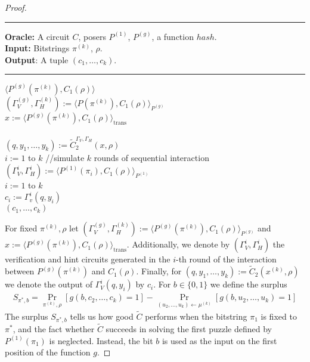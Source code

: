 \begin{proof}
\begin{codeblock}
  \medskip \hrule \medskip
  \textbf{Oracle:}  A circuit $C$, posers $P^{(1)}$, $P^{(g)}$, a function $hash$.\\
  \textbf{Input:} Bitstrings $\pi^{(k)}$, $\rho$.\\
  \textbf{Output}: A tuple $(c_1, \dots, c_k)$.
  \medskip\hrule\medskip
  \Run $\langle P^{(g)}(\pi^{(k)}), C_1(\rho) \rangle$ \\
  \IndI $(\Gamma_V^{(g)}, \Gamma_H^{(k)}) := \langle P(\pi^{(k)}), C_1(\rho) \rangle_{P^{(g)}}$ \\
  \IndI $x := \langle P^{(g)}(\pi^{(k)}), C_1(\rho) \rangle_{\text{trans}}$ \\ \\
  $(q, y_1, \dots, y_k) := \widetilde{C}_2^{\Gamma_V, \Gamma_H} (x, \rho)$ \\
  \For $i:=1$ to $k$ \Do \IndII //simulate $k$ rounds of sequential interaction \\
  \IndI $(\Gamma_V^{i}, \Gamma_H^{i}) := \langle P^{(1)}(\pi_i), C_1(\rho) \rangle_{P^{(1)}} $\\
  \For $i:=1$ to $k$ \Do \\
  \IndI $c_i := \Gamma_v^{i}(q, y_i)$\\
  \return $(c_1, \dots, c_k)$
\end{codeblock}
%

For fixed $\pi^{(k)}, \rho$ let $(\Gamma_V^{(g)}, \Gamma_H^{(k)}) := \langle P^{(g)}(\pi^{(k)}), C_1(\rho) \rangle_{P^{(g)}}$
and $x := \langle P^{(g)}(\pi^{(k)}), C_1(\rho) \rangle_{\text{trans}}$.
Additionally, we denote by $(\Gamma_V^{i}, \Gamma_H^{i})$ the verification and hint circuits generated in the $i$-th
round of the interaction between $P^{(g)}(\pi^{(k)})$ and $C_1(\rho)$.
Finally, for $(q,y_1, \dots, y_k) := \widetilde{C}_2(x^{(k)}, \rho)$ we denote the output of $\Gamma_V^i(q,y_i)$ by $c_i$.
For $b \in \{0,1\}$ we define the surplus
\begin{align}
  \label{eq:s_pi_b}
S_{\pi^*, b} = \underset{\pi^{(k)}, \rho}{\Pr}\left[g(b, c_2, \dots, c_k) = 1\right] - \underset{(u_2, \dots, u_k) \leftarrow \mu^{(k)}}{\Pr}\left[g(b, u_2, \dots, u_k) = 1\right]
\end{align}
%
The surplus $S_{\pi^*, b}$ tells us how good $\widetilde{C}$ performs when the bitstring $\pi_1$ is fixed to $\pi^*$,
and the fact whether $\widetilde{C}$ succeeds in solving the first puzzle defined by $P^{(1)}(\pi_1)$ is neglected.
Instead, the bit $b$ is used as the input on the first position of the function $g$.


\end{proof}
